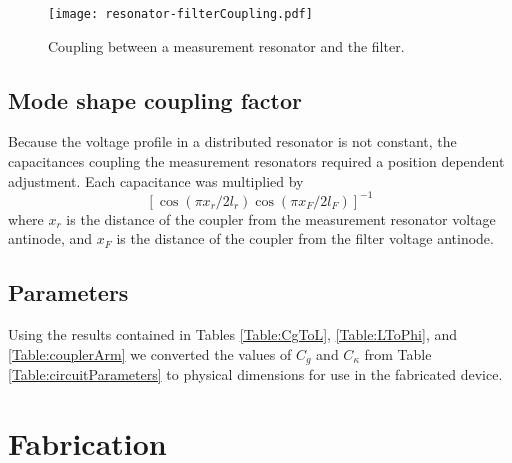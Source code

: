\begin{figure}
\begin{centering}
\texttt{[image: resonator-filterCoupling.pdf]}
\par\end{centering}
\caption{Coupling between a measurement resonator and the filter.}
\label{Fig:resonator-filterCoupling}
\end{figure}


\subsection{Mode shape coupling factor}

Because the voltage profile in a distributed resonator is not constant, the capacitances coupling the measurement resonators required a position dependent adjustment.
Each capacitance was multiplied by \begin{displaymath}
\left[ \cos \left(\pi x_r / 2 l_r \right) \cos \left(\pi x_F / 2 l_F \right) \right]^{-1} \end{displaymath}
where $x_r$ is the distance of the coupler from the measurement resonator voltage antinode, and $x_F$ is the distance of the coupler from the filter voltage antinode.


\subsection{Parameters}

Using the results contained in Tables \ref{Table:CgToL}, \ref{Table:LToPhi}, and \ref{Table:couplerArm} we converted the values of $C_g$ and $C_{\kappa}$ from Table \ref{Table:circuitParameters} to physical dimensions for use in the fabricated device.


\section{Fabrication}

